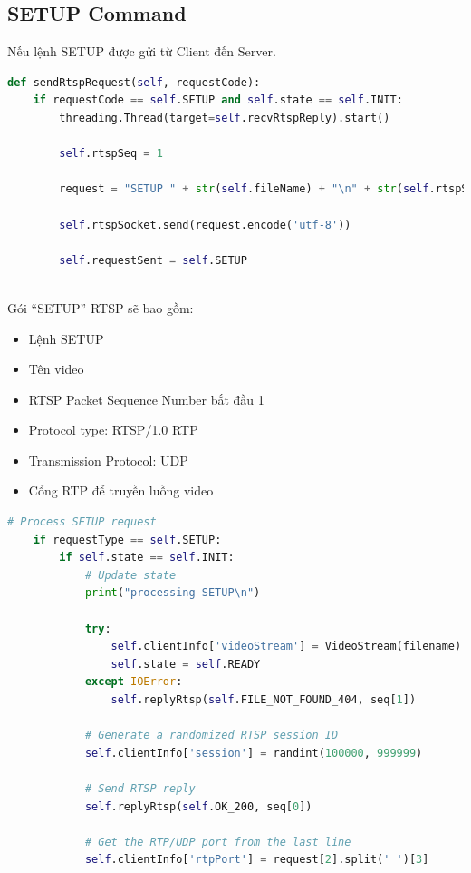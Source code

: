 \documentclass[a4paper]{article}
\begin{document}
\subsection{SETUP Command}
\tab Nếu lệnh SETUP được gửi từ Client đến Server.\\
\begin{lstlisting}[language=Python]
def sendRtspRequest(self, requestCode):
    if requestCode == self.SETUP and self.state == self.INIT:
        threading.Thread(target=self.recvRtspReply).start()
        
        self.rtspSeq = 1
        
        request = "SETUP " + str(self.fileName) + "\n" + str(self.rtspSeq) + "\n" + " RTSP/1.0 RTP/UDP " + str(self.rtpPort)
        
        self.rtspSocket.send(request.encode('utf-8'))
        
        self.requestSent = self.SETUP
\end{lstlisting}
\\
Gói “SETUP” RTSP sẽ bao gồm:\\
    \begin{itemize}
        \item Lệnh SETUP
	    \item Tên video
	    \item RTSP Packet Sequence Number bắt đầu 1
	    \item Protocol type: RTSP/1.0 RTP
	    \item Transmission Protocol: UDP
	    \item Cổng RTP để truyền luồng video
    \end{itemize}
\begin{lstlisting}[language=Python]
# Process SETUP request
    if requestType == self.SETUP:
        if self.state == self.INIT:
            # Update state
            print("processing SETUP\n")
			
            try:
                self.clientInfo['videoStream'] = VideoStream(filename)
                self.state = self.READY
            except IOError:
                self.replyRtsp(self.FILE_NOT_FOUND_404, seq[1])
            
            # Generate a randomized RTSP session ID
            self.clientInfo['session'] = randint(100000, 999999)
			
            # Send RTSP reply
            self.replyRtsp(self.OK_200, seq[0])
            
            # Get the RTP/UDP port from the last line
            self.clientInfo['rtpPort'] = request[2].split(' ')[3]

\end{lstlisting}
\end{document}
